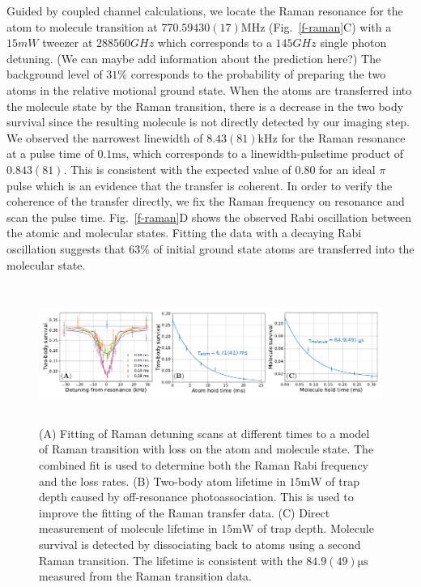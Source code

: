\documentclass[aps,prl,twocolumn,groupedaddress]{revtex4-1}
\newcommand{\todo}[1]{}
\begin{document}
Guided by coupled channel calculations, we locate the Raman resonance for the atom to molecule transition at $770.59430(17) \mathrm{MHz}$ (Fig.~\ref{f-raman}C) with a $15 mW$ tweezer at $288560 GHz$ which corresponds to a $145 GHz$ single photon detuning. (We can maybe add information about the prediction here?)
The background level of $31\%$ corresponds to the probability of preparing the two atoms in the relative motional ground state. When the atoms are transferred into the molecule state by the Raman transition, there is a decrease in the two body survival since the resulting molecule is not directly detected by our imaging step.
We observed the narrowest linewidth of $8.43(81) \mathrm{kHz}$ for the Raman resonance at a pulse time of $0.1 \mathrm{ms}$, which corresponds to a linewidth-pulsetime product of $0.843(81)$. This is consistent with the expected value of $0.80$ for an ideal $\pi$ pulse which is an evidence that the transfer is coherent. In order to verify the coherence of the transfer directly, we fix the Raman frequency on resonance and scan the pulse time. Fig.~\ref{f-raman}D shows the observed Rabi oscillation between the atomic and molecular states. Fitting the data with a decaying Rabi oscillation suggests that $63\%$ of initial ground state atoms are transferred into the molecular state.


\begin{figure}
  \includegraphics[height=4.5cm]{fig3.pdf}
  \caption{
    (A) Fitting of Raman detuning scans at different times to a model of Raman transition
    with loss on the atom and molecule state. The combined fit is used to determine
    both the Raman Rabi frequency and the loss rates.
    (B) \todo{inset?} Two-body atom lifetime in $15 \mathrm{mW}$ of trap depth caused by
    off-resonance photoassociation.
    This is used to improve the fitting of the Raman transfer data.
    (C) Direct measurement of molecule lifetime in $15 \mathrm{mW}$ of trap depth.
    Molecule survival is detected by dissociating back to atoms using a second Raman transition.
    The lifetime is consistent with the $84.9(49) \mathrm{\mu s}$
    measured from the Raman transition data.
    \label{f-lifetime}}
\end{figure}
\end{document}
